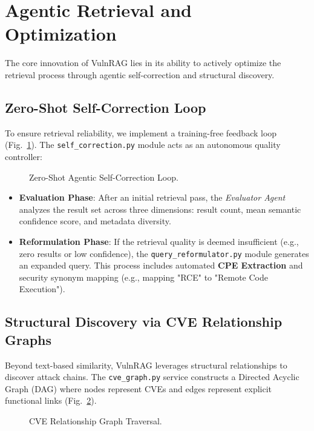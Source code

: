 \section{Agentic Retrieval and Optimization}
\label{sec:optimization}

The core innovation of VulnRAG lies in its ability to actively optimize the retrieval process through agentic self-correction and structural discovery.

\subsection{Zero-Shot Self-Correction Loop}
To ensure retrieval reliability, we implement a training-free feedback loop (Fig.~\ref{fig:self_correction}). The \texttt{self\_correction.py} module acts as an autonomous quality controller:

\begin{figure}[htbp]
    \centering
    \resizebox{\columnwidth}{!}{}
    \caption{Zero-Shot Agentic Self-Correction Loop.}
    \label{fig:self_correction}
\end{figure}

\begin{itemize}
    \item \textbf{Evaluation Phase}: After an initial retrieval pass, the \textit{Evaluator Agent} analyzes the result set across three dimensions: result count, mean semantic confidence score, and metadata diversity.
    \item \textbf{Reformulation Phase}: If the retrieval quality is deemed insufficient (e.g., zero results or low confidence), the \texttt{query\_reformulator.py} module generates an expanded query. This process includes automated \textbf{CPE Extraction} and security synonym mapping (e.g., mapping "RCE" to "Remote Code Execution").
\end{itemize}

\subsection{Structural Discovery via CVE Relationship Graphs}
Beyond text-based similarity, VulnRAG leverages structural relationships to discover attack chains. The \texttt{cve\_graph.py} service constructs a Directed Acyclic Graph (DAG) where nodes represent CVEs and edges represent explicit functional links (Fig.~\ref{fig:graph}).

\begin{figure}[htbp]
    \centering
    \resizebox{\columnwidth}{!}{}
    \caption{CVE Relationship Graph Traversal.}
    \label{fig:graph}
\end{figure}

